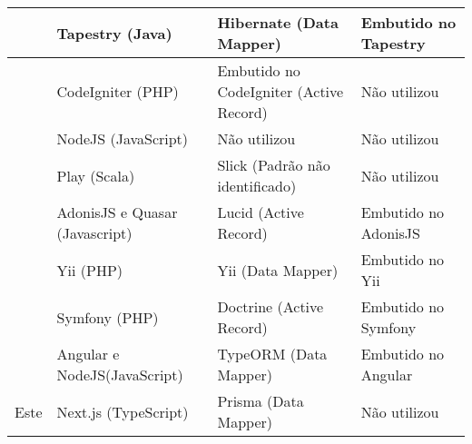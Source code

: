 \begin{table}[h]
\begin{tabularx}{\textwidth}{ 
			| >{\hsize=0.4\hsize}X
			| >{\hsize=0.5\hsize}X	
			| >{\hsize=0.7\hsize}X
			| >{\hsize=0.4\hsize}X
			|
		}
		\citeonline{ferreira:2018} & 
		Tapestry (Java) &
		Hibernate (Data Mapper)  &
		Embutido no Tapestry \\ 
		\hline 
		
		\citeonline{meirelles:2019} & 
		CodeIgniter (PHP) &
		Embutido no CodeIgniter (Active Record) &
		Não utilizou \\
		\hline 
		
		\citeonline{meirelles:2019} & 
		NodeJS (JavaScript) &
		Não utilizou  &
		Não utilizou \\ 
		\hline 
		
		\citeonline{guterres:2019} & 
		Play (Scala) &
		Slick (Padrão não identificado)  &
		Não utilizou \\ 
		\hline 
		
     	\citeonline{dalapicola:2021} & 
		AdonisJS e Quasar (Javascript) &
		Lucid (Active Record)  &
		Embutido no AdonisJS \\ 
		\hline 
		
		\citeonline{berger:2021} & 
		Yii (PHP) &
		Yii  (Data Mapper)  &
		Embutido no Yii \\ 
		\hline 
		
		\citeonline{berger:2021} & 
		Symfony (PHP)  &
		Doctrine (Active Record)  &
		Embutido no Symfony \\ 
		\hline 
	
	    \citeonline{gomes:2022} & 
		Angular e NodeJS(JavaScript) &
		TypeORM (Data Mapper)  &
		Embutido no Angular\\ 
		\hline 

        Este &
        Next.js (TypeScript) &
        Prisma (Data Mapper) &
        Não utilizou \\
        \hline
		
	\end{tabularx}
\end{table}
